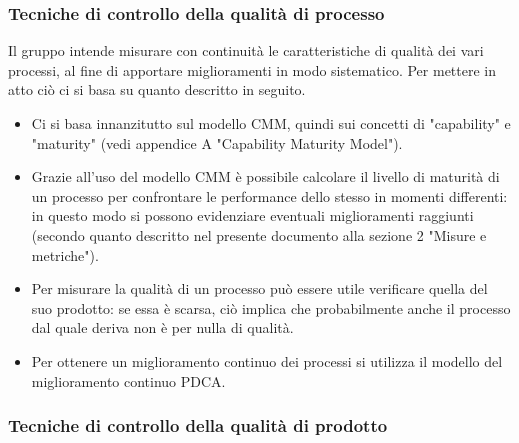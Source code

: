 \documentclass[../PianoDiQualifica.tex]{subfiles}
\begin{document}
			\subsubsection{Tecniche di controllo della qualità di processo}
			Il gruppo intende misurare con continuità le caratteristiche di qualità dei vari processi, al fine di apportare miglioramenti in modo sistematico. Per mettere in atto ciò ci si basa su quanto descritto in seguito.
			\begin{itemize}
				\item Ci si basa innanzitutto sul modello CMM, quindi sui concetti di "capability" e "maturity" (vedi appendice A "Capability Maturity Model").
				\item Grazie all'uso del modello CMM è possibile calcolare il livello di maturità di un processo per confrontare le performance dello stesso in momenti differenti: in questo modo si possono evidenziare eventuali miglioramenti raggiunti (secondo quanto descritto nel presente documento alla sezione 2 "Misure e metriche").
				\item Per misurare la qualità di un processo può essere utile verificare quella del suo prodotto: se essa è scarsa, ciò implica che probabilmente anche il processo dal quale deriva non è per nulla di qualità.
				\item Per ottenere un miglioramento continuo dei processi si utilizza il modello del miglioramento continuo PDCA.
			\end{itemize}
			\subsubsection{Tecniche di controllo della qualità di prodotto}
\end{document}
